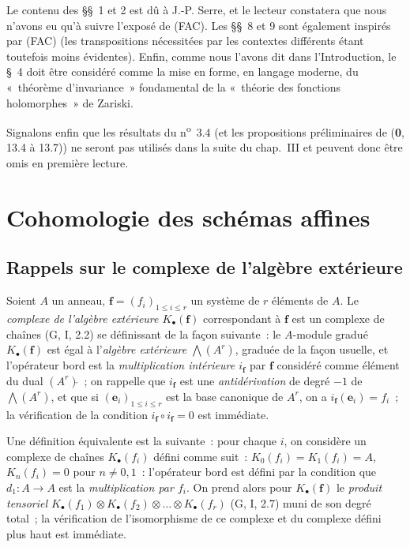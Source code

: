 
Le contenu des \S\S~1 et 2 est dû à J.-P. Serre, et le lecteur constatera que
nous n'avons eu qu'à suivre l'exposé de (FAC). Les \S\S~8 et 9 sont également
inspirés par (FAC) (les transpositions nécessitées par les contextes
différents étant toutefois moins évidentes). Enfin, comme nous l'avons dit
dans l'Introduction, le \S~4 doit être considéré comme la mise en forme, en
langage moderne, du «~théorème d'invariance~» fondamental de la «~théorie des
fonctions holomorphes~» de Zariski.

Signalons enfin que les résultats du n\textsuperscript{o}~3.4 (et les
propositions préliminaires de (\textbf{0}, 13.4 à 13.7)) ne seront pas utilisés dans la
suite du chap.~III et peuvent donc être omis en première lecture.

\setcounter{section}{0}
\section{Cohomologie des schémas affines}
\label{section:III.1-fr}

\subsection{Rappels sur le complexe de l'algèbre extérieure}
\label{subsection:III.1.1-fr}

\begin{env}[1.1.1]
\label{III.1.1.1-fr}
Soient $A$ un anneau, $\mathbf f=(f_i)_{1\leq i\leq r}$ un système de $r$
éléments de $A$. Le \emph{complexe de l'algèbre extérieure
$K_\bullet(\mathbf f)$} correspondant à $\mathbf f$ est un complexe de chaînes
(G, I, 2.2) se définissant de la façon suivante~: le $A$-module gradué
$K_\bullet(\mathbf f)$ est égal à l'\emph{algèbre extérieure
$\bigwedge(A^r)$}, graduée de la façon usuelle, et l'opérateur bord est la
\emph{multiplication intérieure $i_{\mathbf f}$} par $\mathbf f$ considéré
comme élément du dual $(A^r)\check{}$~; on rappelle que $i_{\mathbf f}$ est une
\emph{antidérivation} de degré $-1$ de $\bigwedge(A^r)$, et que si
$(\mathbf e_i)_{1\leq i\leq r}$ est la base canonique de $A^r$, on a
$i_{\mathbf f}(\mathbf e_i)=f_i$~; la vérification de la condition
$i_{\mathbf f}\circ i_{\mathbf f}=0$ est immédiate.

Une définition équivalente est la suivante~: pour chaque $i$, on considère
un complexe de chaînes $K_\bullet(f_i)$ défini comme suit~:
$K_0(f_i)=K_1(f_i)=A$, $K_n(f_i)=0$ pour $n\neq0,1$~: l'opérateur bord est
défini par la condition que $d_1:A\to A$ est la \emph{multiplication par
$f_i$}. On prend alors pour $K_\bullet(\mathbf f)$ le \emph{produit tensoriel
$K_\bullet(f_1)\otimes K_\bullet(f_2)\otimes\ldots\otimes K_\bullet(f_r)$}
(G, I, 2.7) muni de son degré total~; la vérification de l'isomorphisme de ce
complexe et du complexe défini plus haut est immédiate.
\end{env}

